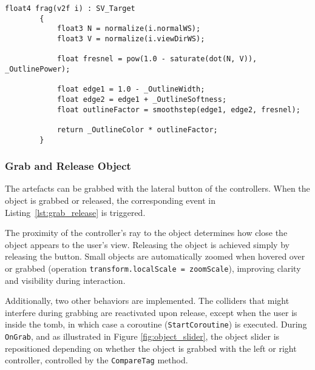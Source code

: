 \begin{lstlisting}[language=HLSL, caption={Partial Fragment shader for creating an outline effect to the object.}, label={lst:outline_effect},float]
        float4 frag(v2f i) : SV_Target
        {
            float3 N = normalize(i.normalWS);
            float3 V = normalize(i.viewDirWS);

            float fresnel = pow(1.0 - saturate(dot(N, V)), _OutlinePower);

            float edge1 = 1.0 - _OutlineWidth;
            float edge2 = edge1 + _OutlineSoftness;
            float outlineFactor = smoothstep(edge1, edge2, fresnel);

            return _OutlineColor * outlineFactor;
        }
\end{lstlisting}

\subsubsection{Grab and Release Object}
\label{sec:object_interaction}

The artefacts can be grabbed with the lateral button of the controllers.
When the object is grabbed or released, the corresponding event in Listing~\ref{lst:grab_release} is triggered.  

The proximity of the controller's ray to the object determines how close the object appears to the user's view. 
Releasing the object is achieved simply by releasing the button.  
Small objects are automatically zoomed when hovered over or grabbed (operation \texttt{transform.localScale = zoomScale}), improving clarity and visibility during interaction.

Additionally, two other behaviors are implemented. 
The colliders that might interfere during grabbing are reactivated upon release, except when the user is inside the tomb, in which case a coroutine (\texttt{StartCoroutine}) is executed.
During \texttt{OnGrab}, and as illustrated in Figure \ref{fig:object_slider}, the object slider is repositioned depending on whether the object is grabbed with the left or right controller, controlled by the \texttt{CompareTag} method.

